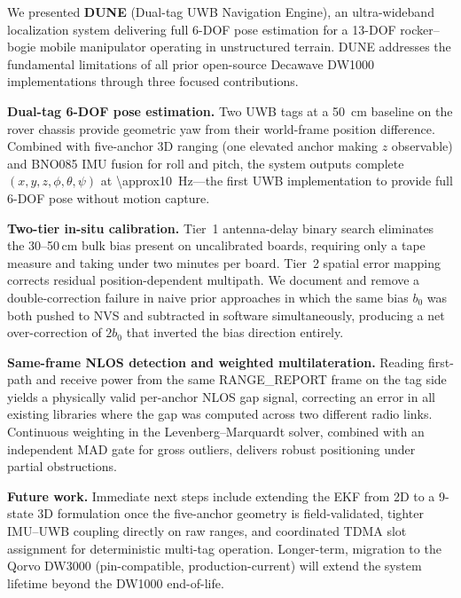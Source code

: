 
We presented \textbf{DUNE} (Dual-tag UWB Navigation Engine), an ultra-wideband
localization system delivering full 6-DOF pose estimation for a 13-DOF
rocker--bogie mobile manipulator operating in unstructured terrain.
DUNE addresses the fundamental limitations of all prior open-source Decawave
DW1000 implementations through three focused contributions.

\textbf{Dual-tag 6-DOF pose estimation.}
Two UWB tags at a \SI{50}{\centi\metre} baseline on the rover chassis provide
geometric yaw from their world-frame position difference.
Combined with five-anchor 3D ranging (one elevated anchor making $z$
observable) and BNO085 IMU fusion for roll and pitch, the system outputs
complete $(x, y, z, \phi, \theta, \psi)$ at \SI{\approx10}{\hertz}---the
first UWB implementation to provide full 6-DOF pose without motion capture.

\textbf{Two-tier in-situ calibration.}
Tier~1 antenna-delay binary search eliminates the 30--50\,cm bulk bias
present on uncalibrated boards, requiring only a tape measure and taking
under two minutes per board.
Tier~2 spatial error mapping corrects residual position-dependent multipath.
We document and remove a double-correction failure in naive prior approaches
in which the same bias $b_0$ was both pushed to NVS and subtracted in
software simultaneously, producing a net over-correction of $2b_0$ that
inverted the bias direction entirely.

\textbf{Same-frame NLOS detection and weighted multilateration.}
Reading first-path and receive power from the same RANGE\_REPORT frame on
the tag side yields a physically valid per-anchor NLOS gap signal, correcting
an error in all existing libraries where the gap was computed across two
different radio links.
Continuous weighting in the Levenberg--Marquardt solver, combined with an
independent MAD gate for gross outliers, delivers robust positioning under
partial obstructions.


\textbf{Future work.}
Immediate next steps include extending the EKF from 2D to a 9-state
3D formulation once the five-anchor geometry is field-validated,
tighter IMU--UWB coupling directly on raw ranges, and coordinated
TDMA slot assignment for deterministic multi-tag operation.
Longer-term, migration to the Qorvo DW3000 (pin-compatible, production-current)
will extend the system lifetime beyond the DW1000 end-of-life.
